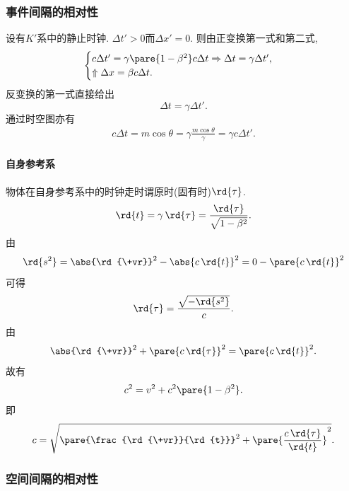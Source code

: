 \documentclass[hidelinks]{ctexart}
\begin{document}

\subsubsection{事件间隔的相对性} %
\label{ssub:事件间隔的相对性}

设有$K'$系中的静止时钟. $\Delta t' > 0$而$\Delta x' = 0$. 则由正变换第一式和第二式,
\[ \begin{cases}
    c\Delta t' = \gamma\pare{1-\beta^2}c\Delta t \Rightarrow \Delta t = \gamma \Delta t', \\
    \Uparrow \Delta x = \beta c\Delta t.
\end{cases} \]
反变换的第一式直接给出
\[ \Delta t = \gamma \Delta t'. \]
通过时空图亦有
\begin{align*}
    c\Delta t = m \cos\theta = \gamma \frac{m\cos\theta}{\gamma} = \gamma c \Delta t'.
\end{align*}


\paragraph{自身参考系} %
\label{par:自身参考系}

物体在自身参考系中的时钟走时谓原时(固有时)$\rd{\tau}$.
\[ \rd{t} = \gamma \,\rd{\tau} = \frac{\rd{\tau}}{\sqrt{1-\beta^2}}. \]
由
\[ \rd{s^2} = \abs{\rd{\+vr}}^2 - \abs{c\,\rd{t}}^2 = 0 - \pare{c\,\rd{t}}^2 \]
可得
\[ \rd{\tau} = \frac{\sqrt{-\rd{s^2}}}{c}. \]
由
\[ \abs{\rd{\+vr}}^2 + \pare{c\,\rd{\tau}}^2 = \pare{c\,\rd{t}}^2. \]
故有
\[ c^2 = v^2 + c^2\pare{1-\beta^2}. \]
即
\[ c = \sqrt{\pare{\frac{\rd{\+vr}}{\rd{t}}}^2 + \pare{\frac{c\,\rd{\tau}}{\rd{t}}}^2}. \]


\subsubsection{空间间隔的相对性} %
\label{ssub:空间间隔的相对性}
\end{document}

